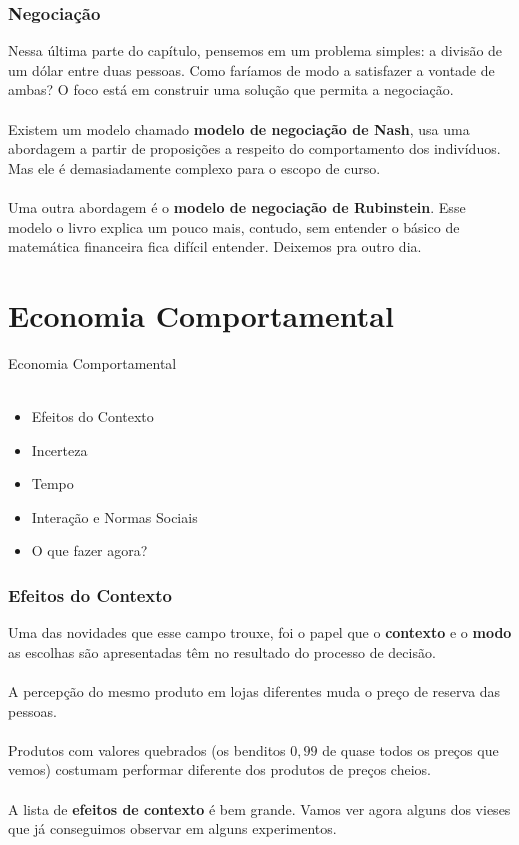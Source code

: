 \documentclass{beamer}[10]
\begin{document}
\begin{frame}
	\frametitle{Negociação}

	Nessa última parte do capítulo, pensemos em um problema simples: a divisão de um dólar entre duas pessoas. Como faríamos de modo a satisfazer a vontade de ambas? O foco está em construir uma solução que permita a negociação.
	\\~\\
	Existem um modelo chamado \textbf{modelo de negociação de Nash}, usa uma abordagem a partir de proposições a respeito do comportamento dos indivíduos. Mas ele é demasiadamente complexo para o escopo de curso.
	\\~\\
	Uma outra abordagem é o \textbf{modelo de negociação de Rubinstein}. Esse modelo o livro explica um pouco mais, contudo, sem entender o básico de matemática financeira fica difícil entender. Deixemos pra outro dia.

\end{frame}


\section[E.Comport.]{Economia Comportamental}
\begin{frame}
	\huge Economia Comportamental \normalsize
	\\~\\
	\begin{itemize}
		\item Efeitos do Contexto
		\item Incerteza
		\item Tempo
		\item Interação e Normas Sociais
		\item O que fazer agora?
	\end{itemize}
\end{frame}


\begin{frame}
	\frametitle{Efeitos do Contexto}

	Uma das novidades que esse campo trouxe, foi o papel que o \textbf{contexto} e o \textbf{modo} as escolhas são apresentadas têm no resultado do processo de decisão. 
	\\~\\
	A percepção do mesmo produto em lojas diferentes muda o preço de reserva das pessoas. 
	\\~\\
	Produtos com valores quebrados (os benditos $0,99$ de quase todos os preços que vemos) costumam performar diferente dos produtos de preços cheios. 
	\\~\\
	A lista de \textbf{efeitos de contexto} é bem grande. Vamos ver agora alguns dos vieses que já conseguimos observar em alguns experimentos.

\end{frame}
\end{document}

